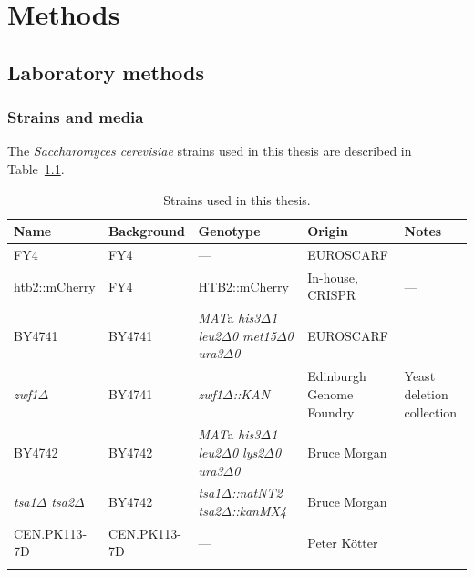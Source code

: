 \chapter{Methods}
\label{ch:methods}

\section{Laboratory methods}
\label{sec:methods-lab}

\subsection{Strains and media}
\label{subsec:methods-strains_media}

The \textit{Saccharomyces cerevisiae} strains used in this thesis are described in Table~\ref{tab:methods-strains}.

\begin{table}[hb]
  \footnotesize
  \centering
  \begin{tabularx}{\linewidth}{bbbbb}
    \toprule
    Name & Background & Genotype & Origin & Notes\\
    \midrule
    FY4 & FY4 & --- & EUROSCARF & \textcite{winstonConstructionSetConvenient1995} \\
    htb2::mCherry & FY4 & HTB2::mCherry & In-house, CRISPR & --- \\
    BY4741 & BY4741 & \textit{MAT}a \textit{his3$\Delta$1 leu2$\Delta$0 met15$\Delta$0 ura3$\Delta$0} & EUROSCARF & \textcite{brachmannDesignerDeletionStrains1998}\\
    \textit{zwf1$\Delta$} & BY4741 & \textit{zwf1$\Delta$::KAN} & Edinburgh Genome Foundry & Yeast deletion collection \\
    BY4742 & BY4742 & \textit{MAT}a \textit{his3$\Delta$1 leu2$\Delta$0 lys2$\Delta$0 ura3$\Delta$0} & Bruce Morgan & \textcite{calabreseHyperoxidationMitochondrialPeroxiredoxin2019}\\
    \textit{tsa1$\Delta$ tsa2$\Delta$} & BY4742 & \textit{tsa1$\Delta$::natNT2 tsa2$\Delta$::kanMX4} & Bruce Morgan & \textcite{calabreseHyperoxidationMitochondrialPeroxiredoxin2019} \\
    CEN.PK113-7D & CEN.PK113-7D & --- & Peter K\"{o}tter & \textcite{nijkampNovoSequencingAssembly2012} \\
    \bottomrule \\
  \end{tabularx}
  \caption{Strains used in this thesis.}
  \label{tab:methods-strains}
\end{table}

